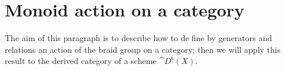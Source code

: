 

\section{Monoid action on a category}
	
	The aim of this paragraph is to describe 
	how to define by generators and relations
	an action of the braid group on a category;
	then we will apply this result to 
	the derived category of a scheme $\cat{D}^{b}(X)$.